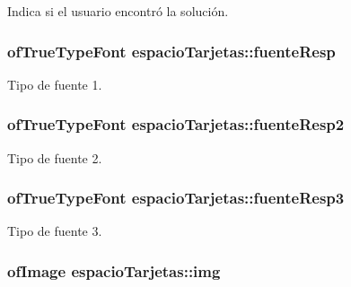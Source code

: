 Indica si el usuario encontró la solución. 

\hypertarget{classespacio_tarjetas_a0ae5d7269e77bc44651ca7c8f3435ef9}{}
\subsubsection[{fuente\+Resp}]{\setlength{\rightskip}{0pt plus 5cm}of\+True\+Type\+Font espacio\+Tarjetas\+::fuente\+Resp\hspace{0.3cm}{\ttfamily [private]}}\label{classespacio_tarjetas_a0ae5d7269e77bc44651ca7c8f3435ef9}


Tipo de fuente 1. 

\hypertarget{classespacio_tarjetas_a69c647527325428e7cb3e0c40d8f6bea}{}
\subsubsection[{fuente\+Resp2}]{\setlength{\rightskip}{0pt plus 5cm}of\+True\+Type\+Font espacio\+Tarjetas\+::fuente\+Resp2\hspace{0.3cm}{\ttfamily [private]}}\label{classespacio_tarjetas_a69c647527325428e7cb3e0c40d8f6bea}


Tipo de fuente 2. 

\hypertarget{classespacio_tarjetas_abec283907dd3683168265677e9df9659}{}
\subsubsection[{fuente\+Resp3}]{\setlength{\rightskip}{0pt plus 5cm}of\+True\+Type\+Font espacio\+Tarjetas\+::fuente\+Resp3\hspace{0.3cm}{\ttfamily [private]}}\label{classespacio_tarjetas_abec283907dd3683168265677e9df9659}


Tipo de fuente 3. 

\hypertarget{classespacio_tarjetas_afa80c75849eae23d80adb0d66ffbd540}{}
\subsubsection[{img}]{\setlength{\rightskip}{0pt plus 5cm}of\+Image espacio\+Tarjetas\+::img\hspace{0.3cm}{\ttfamily [private]}}\label{classespacio_tarjetas_afa80c75849eae23d80adb0d66ffbd540}


